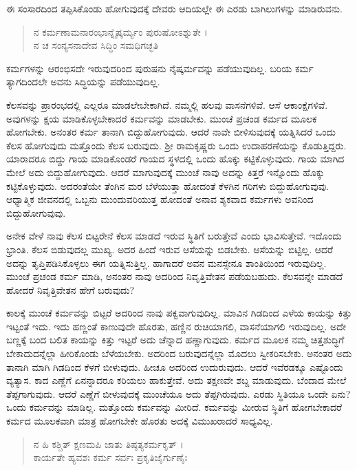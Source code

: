 ಈ ಸಂಸಾರದಿಂದ ತಪ್ಪಿಸಿಕೊಂಡು ಹೋಗುವುದಕ್ಕೆ ದೇವರು ಆದಿಯಲ್ಲೇ ಈ ಎರಡು ಬಾಗಿಲುಗಳನ್ನು ಮಾಡಿರುವನು.

\begin{verse}
ನ ಕರ್ಮಣಾಮನಾರಂಭಾನ್ನೈಷ್ಕರ್ಮ್ಯಂ ಪುರುಷೋಽಶ್ನುತೇ ।\\ನ ಚ ಸಂನ್ಯಸನಾದೇವ ಸಿದ್ಧಿಂ ಸಮಧಿಗಚ್ಛತಿ 
\end{verse}

{\small ಕರ್ಮಗಳನ್ನು ಆರಂಭಿಸದೇ ಇರುವುದರಿಂದ ಪುರುಷನು ನೈಷ್ಕರ್ಮವನ್ನು ಪಡೆಯುವುದಿಲ್ಲ. ಬರಿಯ ಕರ್ಮ ತ್ಯಾಗದಿಂದಲೇ ಅವನು ಸಿದ್ಧಿಯನ್ನು ಪಡೆಯುವುದಿಲ್ಲ.}

ಕೆಲಸವನ್ನು ಪ್ರಾರಂಭದಲ್ಲಿ ಎಲ್ಲರೂ ಮಾಡಲೇಬೇಕಾಗಿದೆ. ನಮ್ಮಲ್ಲಿ ಹಲವು ವಾಸನೆಗಳಿವೆ. ಆಸೆ ಆಕಾಂಕ್ಷೆಗಳಿವೆ. ಅವುಗಳನ್ನು ಕ್ಷಯ ಮಾಡಿಕೊಳ್ಳಬೇಕಾದರೆ ಕರ್ಮವನ್ನು ಮಾಡಬೇಕು. ಮುಂಚೆ ಪ್ರಚಂಡ ಕರ್ಮದ ಮೂಲಕ ಹೋಗಬೇಕು. ಅನಂತರ ಕರ್ಮ ತಾನಾಗಿ ಬಿದ್ದುಹೋಗುವುದು. ಆದರೆ ನಾವೇ ಬೀಳಿಸುವುದಕ್ಕೆ ಯತ್ನಿಸಿದರೆ ಒಂದು ಕೆಲಸ ಹೋಗುವುದು ಮತ್ತೊಂದು ಕೆಲಸ ಬರುವುದು. ಶ್ರೀ ರಾಮಕೃಷ್ಣರು ಒಂದು ಉದಾಹರಣೆಯನ್ನು ಕೊಡುತ್ತಿದ್ದರು. ಯಾರಾದರೂ ಬಿದ್ದು ಗಾಯ ಮಾಡಿಕೊಂಡರೆ ಗಾಯದ ಸ್ಥಳದಲ್ಲಿ ಒಂದು ಹೊಕ್ಕು ಕಟ್ಟಿಕೊಳ್ಳುವುದು. ಗಾಯ ಮಾಗಿದ ಮೇಲೆ ಅದು ಬಿದ್ದುಹೋಗುವುದು. ಆದರೆ ಮಾಗುವುದಕ್ಕೆ ಮುಂಚೆ ನಾವು ಅದನ್ನು ಕಿತ್ತರೆ ಇನ್ನೊಂದು ಹೊಕ್ಕು ಕಟ್ಟಿಕೊಳ್ಳುವುದು. ಅದರಂತೆಯೇ ತೆಂಗಿನ ಮರ ಬೆಳೆಯುತ್ತಾ ಹೋದಂತೆ ಕೆಳಗಿನ ಗರಿಗಳು ಬಿದ್ದುಹೋಗುವುವು. ಆಧ್ಯಾತ್ಮಿಕ ಜೀವನದಲ್ಲಿ ಒಬ್ಬನು ಮುಂದುವರಿಯುತ್ತ ಹೋದಂತೆ ಅನಾವ ಶ್ಯಕವಾದ ಕರ್ಮಗಳು ಅವನಿಂದ ಬಿದ್ದುಹೋಗುವುವು.

ಅನೇಕ ವೇಳೆ ನಾವು ಕೆಲಸ ಬಿಟ್ಟರೇನೆ ಕೆಲಸ ಮಾಡದೆ ಇರುವ ಸ್ಥಿತಿಗೆ ಬರುತ್ತೇವೆ ಎಂದು ಭಾವಿಸುತ್ತೇವೆ. ಇದೊಂದು ಭ್ರಾಂತಿ. ಕೆಲಸ ಬಿಡುವುದಲ್ಲ ಮುಖ್ಯ. ಅದರ ಹಿಂದೆ ಇರುವ ಆಸೆಯನ್ನು ಬಿಡಬೇಕು. ಆಸೆಯನ್ನು ಬಿಟ್ಟಿಲ್ಲ. ಆದರೆ ಅದನ್ನು ತೃಪ್ತಿಪಡಿಸಿಕೊಳ್ಳಲು ಈಗ ಯತ್ನಿಸುತ್ತಿಲ್ಲ. ಹಾಗಾದರೆ ಅವನ ಮನಸ್ಸೇನೂ ಶಾಂತಿಯಿಂದ ಇರುವುದಿಲ್ಲ. ಮುಂಚೆ ಪ್ರಚಂಡ ಕರ್ಮ ಮಾಡಿ, ಅನಂತರ ನಾವು ಅದರಿಂದ ನಿವೃತ್ತಿವೇತನ ಪಡೆಯಬಹುದು. ಕೆಲಸವನ್ನೇ ಮಾಡದೆ ಹೋದರೆ ನಿವೃತ್ತಿವೇತನ ಹೇಗೆ ಬರುವುದು?

ಕಾಲಕ್ಕೆ ಮುಂಚೆ ಕರ್ಮವನ್ನು ಬಿಟ್ಟರೆ ಅದರಿಂದ ನಾವು ಪಕ್ವವಾಗುವುದಿಲ್ಲ. ಮಾವಿನ ಗಿಡದಿಂದ ಎಳೆಯ ಕಾಯನ್ನು ಕಿತ್ತು ಇಟ್ಟಂತೆ ಇದು. ಇದು ಹಣ್ಣಂತೆ ಕಾಣುವುದೇ ಹೊರತು, ಹಣ್ಣಿನ ರುಚಿಯಾಗಲಿ, ವಾಸನೆಯಾಗಲಿ ಇರುವುದಿಲ್ಲ. ಅದೇ ಬಣ್ಣಕ್ಕೆ ಬಂದ ಬಲಿತ ಕಾಯನ್ನು ಕಿತ್ತು ಇಟ್ಟರೆ ಅದು ಚೆನ್ನಾದ ಹಣ್ಣಾಗುವುದು. ಕರ್ಮದ ಮೂಲಕ ನಮ್ಮ ಚಿತ್ತಶುದ್ಧಿಗೆ ಬೇಕಾದುದನ್ನೆಲ್ಲಾ ಹೀರಿಕೊಂಡು ಬೆಳೆಯಬೇಕು. ಅದರಿಂದ ಬರುವುದನ್ನೆಲ್ಲಾ ಮೊದಲು ಸ್ವೀಕರಿಸಬೇಕು. ಅನಂತರ ಅದು ತಾನಾಗಿ ಮಾಗಿ ಗಿಡದಿಂದ ಕೆಳಗೆ ಬೀಳುವುದು. ಹೀಚೂ ಅದರಿಂದ ಉದುರುವುದು. ಆದರೆ ಇವೆರಡಕ್ಕೂ ಎಷ್ಟೊಂದು ವ್ಯತ್ಯಾಸ. ಕಾದ ಎಣ್ಣೆಗೆ ಏನನ್ನಾದರೂ ಕರಿಯಲು ಹಾಕುತ್ತೇವೆ. ಅದು ತಕ್ಷಣವೇ ಶಬ್ದ ಮಾಡುವುದು. ಬೆಂದಾದ ಮೇಲೆ ತೆಪ್ಪಗಾಗುವುದು. ಆದರೆ ಎಣ್ಣೆಗೆ ಬೀಳುವುದಕ್ಕೆ ಮುಂಚೆಯೂ ಅದು ತೆಪ್ಪಗಿರುವುದು. ಎರಡು ಸ್ಥಿತಿಯೂ ಒಂದೇ ಏನು? ಒಂದು ಕರ್ಮವನ್ನು ಮಾಡಿಲ್ಲ. ಮತ್ತೊಂದು ಕರ್ಮವನ್ನು ಮೀರಿದೆ. ಕರ್ಮವನ್ನು ಮೀರುವ ಸ್ಥಿತಿಗೆ ಹೋಗಬೇಕಾದರೆ ಕರ್ಮದ ಮೂಲಕವಾಗಿ ಮಾತ್ರ ಹೋಗಬೇಕೇ ಹೊರತು ಅದಕ್ಕೆ ವಿಮುಖರಾದರೆ ಸಾಧ್ಯವಿಲ್ಲ.

\begin{verse}
ನ ಹಿ ಕಶ್ಚಿತ್ ಕ್ಷಣಮಪಿ ಜಾತು ತಿಷ್ಠತ್ಯಕರ್ಮಕೃತ್ ।\\ಕಾರ್ಯತೇ ಹ್ಯವಶಃ ಕರ್ಮ ಸರ್ವಃ ಪ್ರಕೃತಿಜೈರ್ಗುಣೈಃ 
\end{verse}

